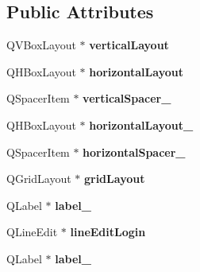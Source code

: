 \subsection*{Public Attributes}
\begin{DoxyCompactItemize}
\item 
\hypertarget{classUi__Dialog_a02f973813b741621c5461918b3d9d4bb}{Q\-V\-Box\-Layout $\ast$ {\bfseries vertical\-Layout}}\label{classUi__Dialog_a02f973813b741621c5461918b3d9d4bb}

\item 
\hypertarget{classUi__Dialog_ae66a1da203f045e33d71ed5abd46d2a1}{Q\-H\-Box\-Layout $\ast$ {\bfseries horizontal\-Layout}}\label{classUi__Dialog_ae66a1da203f045e33d71ed5abd46d2a1}

\item 
\hypertarget{classUi__Dialog_a81b52d0f39bcb5cfd3c51f18961c650b}{Q\-Spacer\-Item $\ast$ {\bfseries vertical\-Spacer\-\_}}\label{classUi__Dialog_a81b52d0f39bcb5cfd3c51f18961c650b}

\item 
\hypertarget{classUi__Dialog_a289b49bcdd28408efe2510f029535c2b}{Q\-H\-Box\-Layout $\ast$ {\bfseries horizontal\-Layout\-\_}}\label{classUi__Dialog_a289b49bcdd28408efe2510f029535c2b}

\item 
\hypertarget{classUi__Dialog_affee116cbe843086b0e35ebf998fb67c}{Q\-Spacer\-Item $\ast$ {\bfseries horizontal\-Spacer\-\_}}\label{classUi__Dialog_affee116cbe843086b0e35ebf998fb67c}

\item 
\hypertarget{classUi__Dialog_a41336d41594e8776a81d095e8e4ffc61}{Q\-Grid\-Layout $\ast$ {\bfseries grid\-Layout}}\label{classUi__Dialog_a41336d41594e8776a81d095e8e4ffc61}

\item 
\hypertarget{classUi__Dialog_acfbb1773ba7dc7aa425b0b3b8981686a}{Q\-Label $\ast$ {\bfseries label\-\_}}\label{classUi__Dialog_acfbb1773ba7dc7aa425b0b3b8981686a}

\item 
\hypertarget{classUi__Dialog_abb48dec9e79eb09f978bf5fb062fe7de}{Q\-Line\-Edit $\ast$ {\bfseries line\-Edit\-Login}}\label{classUi__Dialog_abb48dec9e79eb09f978bf5fb062fe7de}

\item 
\hypertarget{classUi__Dialog_a3bb3c83086d124c6e85906f15c8add64}{Q\-Label $\ast$ {\bfseries label\-\_}}\label{classUi__Dialog_a3bb3c83086d124c6e85906f15c8add64}


\end{DoxyCompactItemize}
